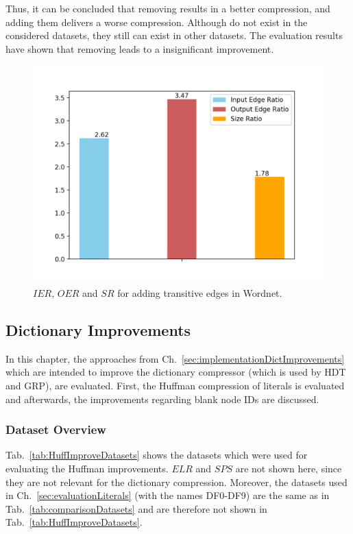 Thus, it can be concluded that removing \dtps results in a better compression, and adding them delivers a worse compression. Although \dtps do not exist in the considered datasets, they still can exist in other datasets. The evaluation results have shown that removing \dtps leads to a insignificant improvement. 

\begin{figure}
	\centering
	\includegraphics[width=0.8\linewidth]{figures/4_evaluation/ontology/ratioTransitivesAdd}
	\caption{$IER$, $OER$ and $SR$ for adding transitive edges in Wordnet.}
	\label{fig:ratiotransitivesAdd}
\end{figure}


\subsection{Dictionary Improvements}\label{sec:evaluationDictImprovements}

In this chapter, the approaches from Ch.~\ref{sec:implementationDictImprovements} which are intended to improve the dictionary compressor \DHDT{} (which is used by HDT and GRP), are evaluated. First, the Huffman compression of literals is evaluated and afterwards, the improvements regarding blank node IDs are discussed. 

\subsubsection{Dataset Overview}

Tab.~\ref{tab:HuffImproveDatasets} shows the datasets which were used for evaluating the Huffman improvements. $ELR$ and $SPS$ are not shown here, since they are not relevant for the dictionary compression. Moreover, the datasets used in Ch.~\ref{sec:evaluationLiterals} (with the names DF0-DF9) are the same as in Tab.~\ref{tab:comparisonDatasets} and are therefore not shown in Tab.~\ref{tab:HuffImproveDatasets}.

